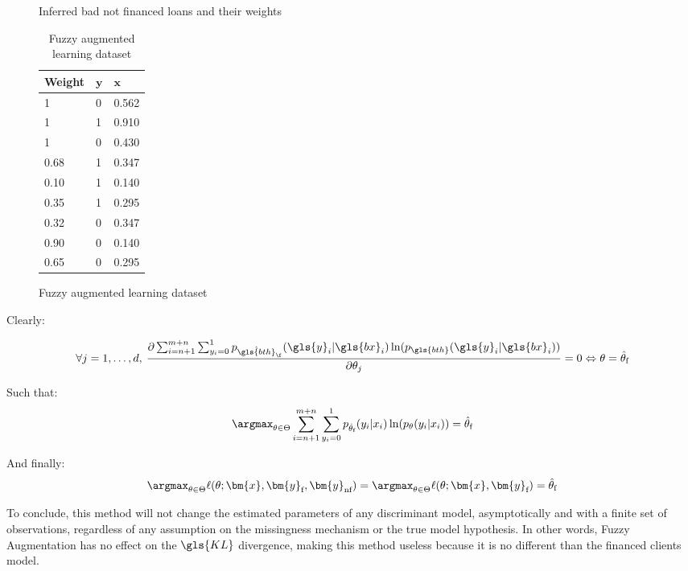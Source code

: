 \begin{table}
{\begin{multicols}{4}
\begin{subfigure}[t]{0.22\textwidth}
\caption{Inferred bad not financed loans and their weights}
\label{fuzzy:sfig3}
\end{subfigure}

\columnbreak

\begin{subfigure}[t]{0.22\textwidth}
\begin{center}
\begin{adjustbox}{max width=0.95\textwidth}
\begin{tabular}{l l l}
\toprule
\textbf{Weight} & \textbf{${\bm{y}}$} & \textbf{${\bm{x}}$}\\
\midrule
1 & 0 & 0.562 \\
1 & 1 & 0.910 \\
1 & 0 & 0.430 \\
0.68 & 1 & 0.347 \\
0.10 & 1 & 0.140 \\
0.35 & 1 & 0.295 \\
0.32 & 0 & 0.347 \\
0.90 & 0 & 0.140 \\
0.65 & 0 & 0.295 \\
\bottomrule
\end{tabular}
\end{adjustbox}
\end{center}
\caption{Fuzzy augmented learning dataset}
\label{fuzzy:sfig4}
\end{subfigure}

\end{multicols}
}
\end{table}

 Clearly:

 \[ \forall j = 1, \ldots, d, \: \frac{\partial \sum_{i=n+1}^{m+n} \sum_{y_i = 0}^{1} p_{\hat{\gls{bth}}_\f}(\gls{y}_i| \gls{bx}_i)\ln (p_{\gls{bth}}(\gls{y}_i| \gls{bx}_i))}{\partial \theta_j} = 0 \Leftrightarrow \theta = \hat{\theta}_{\text{f}} \]

 Such that:
 \[\argmax_{\theta \in \Theta}  \sum_{i=n+1}^{m+n} \sum_{y_i = 0}^{1} p_{\hat{\theta}_{\text{f}}}(y_i| x_i)\ln (p_\theta(y_i| x_i)) = \hat{\theta}_{\text{f}}\]

 And finally:
 \[\argmax_{\theta \in \Theta} \ell(\theta;{\bm{x}},{\bm{y}}_{\text{f}},{\bm{y}}_{\text{nf}}) = \argmax_{\theta \in \Theta} \ell(\theta;{\bm{x}},{\bm{y}}_{\text{f}}) = \hat{\theta}_{\text{f}}\]

 To conclude, this method will not change the estimated parameters of any discriminant model, asymptotically and with a finite set of observations, regardless of any assumption on the missingness mechanism or the true model hypothesis. In other words, Fuzzy Augmentation has no effect on the $\gls{KL}$ divergence, making this method useless because it is no different than the financed clients model.


